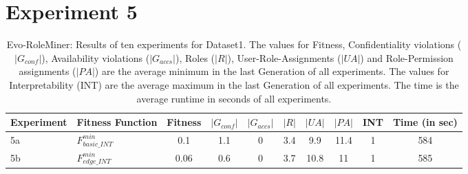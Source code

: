 \section{Experiment 5}
\label{sec:A_Exp5}
	\begin{table}[H]
		\centering
		\caption{Evo-RoleMiner: Results of ten experiments for Dataset1. The values for Fitness, Confidentiality violations ($|G_{conf}|$), Availability violations ($|G_{accs}|$), Roles ($|R|$), User-Role-Assignments ($|UA|$) and Role-Permission assignments ($|PA|$) are the average minimum in the last Generation of all experiments. The values for Interpretability (INT) are the average maximum in the last Generation of all experiments. The time is the average runtime in seconds of all experiments.}
		\label{tab:exp5_results}
		\begin{adjustbox}{width=\textwidth}
			\begin{tabular}{|l|l|c|c|c|c|c|c|c|c|}
				\hline
				\rowcolor{myGray} 
				\textbf{Experiment} & \textbf{Fitness Function} & \textbf{Fitness} & \textbf{$|G_{conf}|$} & \textbf{$|G_{accs}|$} & \textbf{$|R|$} & \textbf{$|UA|$} & \textbf{$|PA|$} & \textbf{INT} & \textbf{Time (in sec)}\\ \hline
				5a & $F_{basic\_INT}^{min}$ &   0.1  &   1.1   &   0   &   3.4   &   9.9   &   11.4   &   1   &   584\\ \hline
				5b & $F_{edge\_INT}^{min}$ &   0.06   &   0.6   &   0   &   3.7   &   10.8   &   11   &   1   &   585\\ \hline
			\end{tabular}
		\end{adjustbox}
	\end{table}